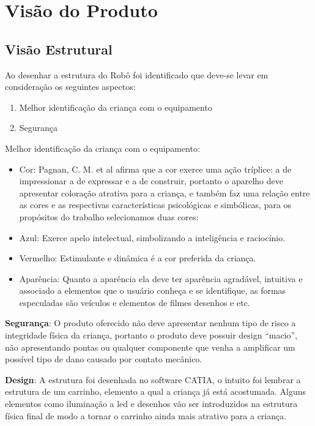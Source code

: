 \chapter[Visão do Produto]{Visão do Produto}

\section{Visão Estrutural}

Ao desenhar a estrutura do Robô foi identificado que deve-se levar em consideração os seguintes aspectos:
\begin{enumerate}
	\item Melhor identificação da criança com o equipamento
	\item Segurança
\end{enumerate}

Melhor identificação da criança com o equipamento:
\begin{itemize}
\item Cor: Pagnan, C. M. et al afirma que a cor exerce uma ação tríplice: a de impressionar a de expressar e a de construir, portanto o aparelho deve apresentar coloração atrativa para a criança, e também faz uma relação entre as cores e as respectivas características psicológicas e simbólicas, para os propósitos do trabalho selecionamos duas cores:
\item Azul: Exerce apelo intelectual, simbolizando a inteligência e raciocínio.
\item Vermelho: Estimulante e dinâmica é a cor preferida da criança.
\item Aparência: Quanto a aparência ela deve ter aparência agradável, intuitiva e associado a elementos que o usuário conheça e se identifique, as formas especuladas são veículos e elementos de filmes desenhos e etc.
\end{itemize}

\textbf{Segurança}:
O produto oferecido não deve apresentar nenhum tipo de risco a integridade física da criança, portanto o produto deve possuir design “macio”, não apresentando pontas ou qualquer componente que venha a amplificar um possível tipo de dano causado por contato mecânico.

\textbf{Design}:
A estrutura foi desenhada no software CATIA, o intuito foi lembrar a estrutura de um carrinho, elemento a qual a criança já está acostumada. Alguns elementos como iluminação a led e desenhos vão ser introduzidos na estrutura física final de modo a tornar o carrinho ainda mais atrativo para a criança.

